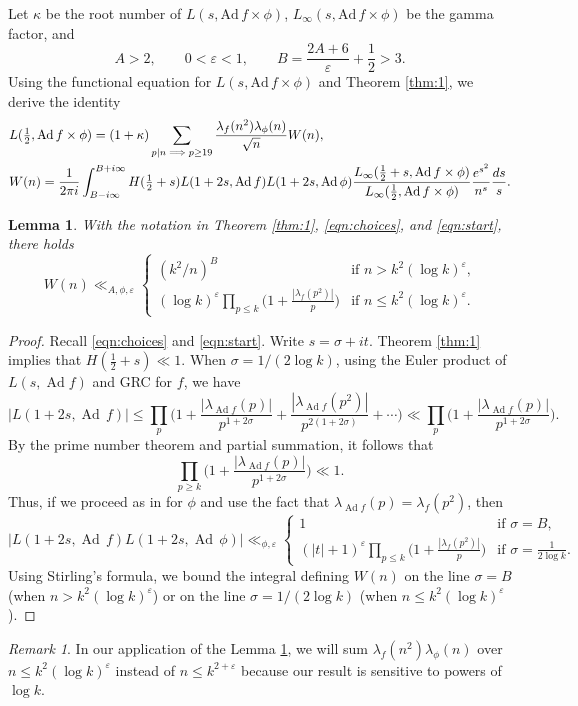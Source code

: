 \documentclass[12pt,reqno]{amsart}
\newtheorem{lem}[thm]{Lemma}
\theoremstyle{remark}
\newtheorem*{rek}{Remark}
\DeclareMathOperator{\ad}{Ad}
\numberwithin{equation}{section}
\begin{document}
Let $\kappa$ be the root number of $L(s,\mathrm{Ad}\, f \times\phi)$, $L_{\infty}(s,\mathrm{Ad}\,f\times \phi)$ be the gamma factor, and
\begin{equation}
\label{eqn:choices}
A > 2,\qquad 0<\varepsilon<1,\qquad B = \frac{2A+6}{\varepsilon}+\frac{1}{2}>3.
\end{equation}
Using the functional equation for $L(s,\mathrm{Ad}\, f \times \phi)$ and Theorem \ref{thm:1}, we derive the identity
\begin{align}
\label{eqn:start}
&L(\tfrac{1}{2},\mathrm{Ad}\, f\times \phi) = (1+\kappa)\sum_{p\mid n\implies p \geq 19}\frac{\lambda_f(n^2)\lambda_{\phi}(n)}{\sqrt{n}}W(n),\\
&W(n) = \frac{1}{2\pi i}\int_{B-i\infty}^{B+i\infty}H(\tfrac{1}{2}+s)L(1+2s,\mathrm{Ad}\, f)L(1+2s,\mathrm{Ad}\, \phi)\frac{L_{\infty}(\tfrac{1}{2}+s,\mathrm{Ad}\, f \times \phi)}{L_{\infty}(\tfrac{1}{2},\mathrm{Ad}\, f \times \phi)}\frac{e^{s^2}}{n^s}\frac{ds}{s}.\notag
\end{align}
\begin{lem}
\label{lem:W_bounds}
With the notation in Theorem \ref{thm:1}, \eqref{eqn:choices}, and \eqref{eqn:start}, there holds
\[
W(n)\ll_{A,\phi,\varepsilon}\begin{cases}
	(k^2/n)^B&\mbox{if $n>k^2(\log k)^{\varepsilon}$,}\\
	 (\log k)^{\varepsilon} \prod_{p \le k} \big( 1+\frac{|\lambda_f(p^2)|}{p}\big) &\mbox{if $n\leq k^2(\log k)^{\varepsilon}$.}
\end{cases}
\]
\end{lem}
\begin{proof}
Recall \eqref{eqn:choices} and \eqref{eqn:start}.  Write $s=\sigma+it$.
Theorem \ref{thm:1} implies that $H(\tfrac{1}{2}+s)\ll 1$. 
When $\sigma=1/(2\log k)$, using the Euler product of $L(s, \ad f)$ and GRC for $f$, we have 
\[
|L(1+2s,\ad\,f)|  \le \prod_{p} \Big( 1+\frac{|\lambda_{\ad f}(p)|}{p^{1+2\sigma}} + \frac{|\lambda_{\ad f}(p^2)|}{p^{2(1+2\sigma)}}+\cdots\Big) \ll \prod_{p} \Big( 1+\frac{|\lambda_{\ad f}(p)|}{p^{1+2\sigma}}\Big).
\]
By the prime number theorem and partial summation, it follows that 
\[
\prod_{p \ge k} \Big( 1+\frac{|\lambda_{\ad f}(p)|}{p^{1+2\sigma}}\Big) \ll 1.
\]
Thus, if we proceed as in \cite[Theorem 2]{L} for $\phi$ and use the fact that $\lambda_{\ad f}(p) = \lambda_f(p^2)$, then
\[
|L(1+2s,\ad\,f)L(1+2s,\ad\,\phi)|\ll_{\phi,\varepsilon}\begin{cases}
	1&\mbox{if $\sigma=B$,}\\
	(|t|+1)^{\varepsilon}\prod_{p \le k} \big( 1+\frac{|\lambda_f(p^2)|}{p}\big) &\mbox{if $\sigma=\frac{1}{2\log k}$.}
\end{cases}
\]
Using Stirling's formula, we bound the integral defining $W(n)$ on the line $\sigma=B$ (when $n>k^2(\log k)^{\varepsilon}$) or on the line $\sigma=1/(2\log k)$ (when $n\leq k^2(\log k)^{\varepsilon}$).
\end{proof}
\begin{rek}
In our application of the Lemma \ref{lem:W_bounds}, we will sum $\lambda_f(n^2)\lambda_{\phi}(n)$ over $n\leq k^2(\log k)^{\varepsilon}$ instead of $n\leq k^{2+\varepsilon}$ because our result is sensitive to powers of $\log k$.  
\end{rek}
\end{document}
